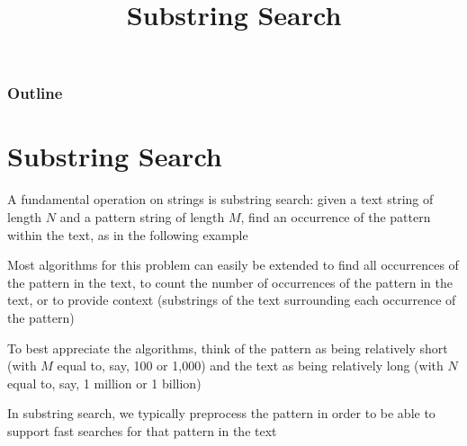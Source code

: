 \documentclass[8pt,a4paper,compress]{beamer}
\title{Substring Search}
\date{}
\begin{document}
\begin{frame}
\vfill
\titlepage
\end{frame}

\begin{frame}
\frametitle{Outline}
\tableofcontents
\end{frame}

\section{Substring Search}
\begin{frame}[fragile]
\pause

A fundamental operation on strings is substring search: given a text string of length $N$ and a pattern string of length $M$, find an occurrence of the pattern within the text, as in the following example

\begin{center}
\end{center}

\pause
\bigskip

Most algorithms for this problem can easily be extended to find all occurrences of the pattern in the text, to count the number of occurrences of the pattern in the text, or to provide context (substrings of the text surrounding each occurrence of the pattern)

\pause
\bigskip

To best appreciate the algorithms, think of the pattern as being relatively short (with $M$ equal to, say, 100 or 1,000) and the text as being relatively long (with $N$ equal to, say, 1 million or 1 billion)

\pause
\bigskip

In substring search, we typically preprocess the pattern in order to be able to support fast searches for that pattern in the text
\end{frame}
\end{document}
